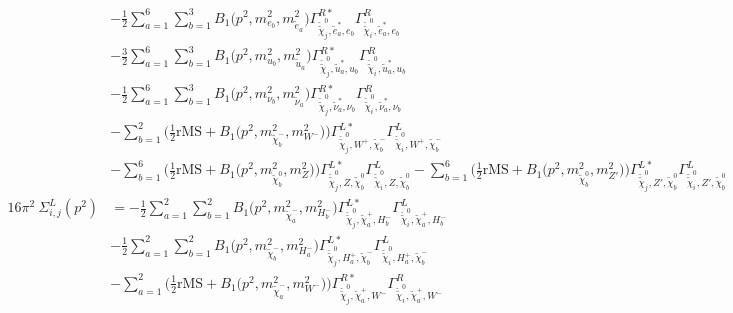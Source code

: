 \begin{itemize}
\begin{align}
 &-\frac{1}{2} \sum_{a=1}^{6}\sum_{b=1}^{3}{B_1\Big(p^{2},m^2_{e_{{b}}},m^2_{\tilde{e}_{{a}}}\Big)} {\Gamma^{R*}_{\check{\tilde{\chi}}^0_{{j}},\tilde{e}^*_{{a}},e_{{b}}}} {\Gamma^R_{\check{\tilde{\chi}}^0_{{i}},\tilde{e}^*_{{a}},e_{{b}}}}  \nonumber \\ 
 &-\frac{3}{2} \sum_{a=1}^{6}\sum_{b=1}^{3}{B_1\Big(p^{2},m^2_{u_{{b}}},m^2_{\tilde{u}_{{a}}}\Big)} {\Gamma^{R*}_{\check{\tilde{\chi}}^0_{{j}},\tilde{u}^*_{{a}},u_{{b}}}} {\Gamma^R_{\check{\tilde{\chi}}^0_{{i}},\tilde{u}^*_{{a}},u_{{b}}}}  \nonumber \\ 
 &-\frac{1}{2} \sum_{a=1}^{6}\sum_{b=1}^{3}{B_1\Big(p^{2},m^2_{\nu_{{b}}},m^2_{\tilde{\nu}_{{a}}}\Big)} {\Gamma^{R*}_{\check{\tilde{\chi}}^0_{{j}},\tilde{\nu}^*_{{a}},\nu_{{b}}}} {\Gamma^R_{\check{\tilde{\chi}}^0_{{i}},\tilde{\nu}^*_{{a}},\nu_{{b}}}}  \nonumber \\ 
 &- \sum_{b=1}^{2}\Big(\frac{1}{2} \text{rMS}  + {B_1\Big(p^{2},m^2_{\tilde{\chi}^-_{{b}}},m^2_{W^-}\Big)}\Big){\Gamma^{L*}_{\check{\tilde{\chi}}^0_{{j}},W^+,\tilde{\chi}^-_{{b}}}} {\Gamma^L_{\check{\tilde{\chi}}^0_{{i}},W^+,\tilde{\chi}^-_{{b}}}}  \nonumber \\ 
 &- \sum_{b=1}^{6}\Big(\frac{1}{2} \text{rMS}  + {B_1\Big(p^{2},m^2_{\tilde{\chi}^0_{{b}}},m^2_{Z}\Big)}\Big){\Gamma^{L*}_{\check{\tilde{\chi}}^0_{{j}},Z,\tilde{\chi}^0_{{b}}}} {\Gamma^L_{\check{\tilde{\chi}}^0_{{i}},Z,\tilde{\chi}^0_{{b}}}}  - \sum_{b=1}^{6}\Big(\frac{1}{2} \text{rMS}  + {B_1\Big(p^{2},m^2_{\tilde{\chi}^0_{{b}}},m^2_{{Z'}}\Big)}\Big){\Gamma^{L*}_{\check{\tilde{\chi}}^0_{{j}},{Z'},\tilde{\chi}^0_{{b}}}} {\Gamma^L_{\check{\tilde{\chi}}^0_{{i}},{Z'},\tilde{\chi}^0_{{b}}}}  \\ 
16\pi^2 \ \Sigma^L_{i,j}(p^2) &= -\frac{1}{2} \sum_{a=1}^{2}\sum_{b=1}^{2}{B_1\Big(p^{2},m^2_{\tilde{\chi}^-_{{a}}},m^2_{H^-_{{b}}}\Big)} {\Gamma^{L*}_{\check{\tilde{\chi}}^0_{{j}},\tilde{\chi}^+_{{a}},H^-_{{b}}}} {\Gamma^L_{\check{\tilde{\chi}}^0_{{i}},\tilde{\chi}^+_{{a}},H^-_{{b}}}}  \nonumber \\ 
 &-\frac{1}{2} \sum_{a=1}^{2}\sum_{b=1}^{2}{B_1\Big(p^{2},m^2_{\tilde{\chi}^-_{{b}}},m^2_{H^-_{{a}}}\Big)} {\Gamma^{L*}_{\check{\tilde{\chi}}^0_{{j}},H^+_{{a}},\tilde{\chi}^-_{{b}}}} {\Gamma^L_{\check{\tilde{\chi}}^0_{{i}},H^+_{{a}},\tilde{\chi}^-_{{b}}}}  \nonumber \\ 
 &- \sum_{a=1}^{2}\Big(\frac{1}{2} \text{rMS}  + {B_1\Big(p^{2},m^2_{\tilde{\chi}^-_{{a}}},m^2_{W^-}\Big)}\Big){\Gamma^{R*}_{\check{\tilde{\chi}}^0_{{j}},\tilde{\chi}^+_{{a}},W^-}} {\Gamma^R_{\check{\tilde{\chi}}^0_{{i}},\tilde{\chi}^+_{{a}},W^-}}  \nonumber \\ 

\end{align}
\end{itemize}
